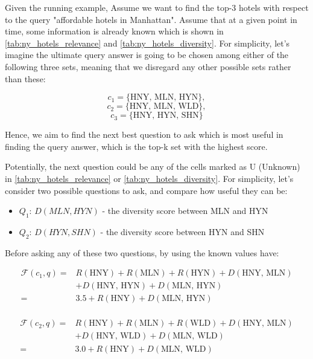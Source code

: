 \begin{example}
\label{example2.3}
    Given the running example, Assume we want to find the top-3 hotels with respect to the query "affordable hotels in Manhattan". Assume that at a given point in time, some information is already known which is shown in \autoref{tab:ny_hotels_relevance} and \autoref{tab:ny_hotels_diversity}. For simplicity, let's imagine the ultimate query answer is going to be chosen among either of the following three sets, meaning that we disregard any other possible sets rather than these:
    
    \[
    c_1 = \{\text{HNY, MLN, HYN}\}, 
\]
\[
    c_2 = \{\text{HNY, MLN, WLD}\},
\]
\[
    c_3 = \{\text{HNY, HYN, SHN}\}
\]

    Hence, we aim to find the next best question to ask which is most useful in finding the query answer, which is the top-k set with the highest score.
    
    Potentially, the next question could be any of the cells marked as U (Unknown) in \autoref{tab:ny_hotels_relevance} or \autoref{tab:ny_hotels_diversity}. For simplicity, let's consider two possible questions to ask, and compare how useful they can be:
    
    \begin{itemize}
        \item \( Q_1 \): \(D(MLN, HYN)\) - the diversity score between MLN and HYN
        \item \( Q_2 \): \(D(HYN, SHN)\) - the diversity score between HYN and SHN
    \end{itemize}

    Before asking any of these two questions, by using the known values have:

\[
\begin{aligned}
    \mathcal{F}(c_1, q) = 
    & R(\text{HNY}) + R(\text{MLN}) + R(\text{HYN}) + D(\text{HNY, MLN}) \\
    & + D(\text{HNY, HYN}) + D(\text{MLN, HYN}) \\
    = & 3.5 + R(\text{HNY}) + D(\text{MLN, HYN}) \\
\end{aligned}
\]

\[
\begin{aligned}
    \mathcal{F}(c_2, q) = 
    & R(\text{HNY}) + R(\text{MLN}) + R(\text{WLD}) + D(\text{HNY, MLN}) \\
    & + D(\text{HNY, WLD}) + D(\text{MLN, WLD}) \\
    = & 3.0 + R(\text{HNY}) + D(\text{MLN, WLD}) 
\end{aligned}
\]



\end{example}
